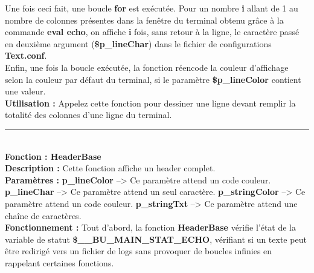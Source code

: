 \documentclass[a4paper,10pt]{article}
\begin{document}
Une fois ceci fait, une boucle \textbf{for} est exécutée. Pour un nombre \textbf{i} allant de 1 au nombre de colonnes présentes dans la fenêtre du terminal obtenu grâce à la commande \textbf{\color{gray}eval echo\color{white}}, on affiche \textbf{i} fois, sans retour à la ligne, le caractère passé en deuxième argument (\textbf{\color{orange}\$p\_lineChar\color{white}}) dans le fichier de\linebreak
configurations \textbf{\color{lime}Text.conf\color{white}}.\\[1\baselineskip]

Enfin, une fois la boucle exécutée, la fonction réencode la couleur d'affichage selon la couleur par\linebreak
défaut du terminal, si le paramètre \textbf{\color{orange}\$p\_lineColor\color{white}} contient une valeur.\\[1\baselineskip]

\textbf{Utilisation :}\linebreak
Appelez cette fonction pour dessiner une ligne devant remplir la totalité des colonnes d'une ligne du terminal.\\[2\baselineskip]


\par\noindent\rule{\textwidth}{0.4pt}\\[1\baselineskip]

\textbf{Fonction : \color{mauve}HeaderBase\color{white}}\\[1\baselineskip]
\textbf{Description :}\linebreak
Cette fonction affiche un header complet.\\[1\baselineskip]

\textbf{Paramètres :}\linebreak
\textbf{\color{orange}p\_lineColor\color{white}} --> Ce paramètre attend un code couleur.\linebreak
\textbf{\color{orange}p\_lineChar\color{white}} --> Ce paramètre attend un seul caractère.\linebreak
\textbf{\color{orange}p\_stringColor\color{white}} --> Ce paramètre attend un code couleur.\linebreak
\textbf{\color{orange}p\_stringTxt\color{white}} --> Ce paramètre attend une chaîne de caractères.\\[1\baselineskip]

\textbf{Fonctionnement :}\linebreak
Tout d'abord, la fonction \textbf{\color{mauve}HeaderBase\color{white}} vérifie l'état de la variable de statut \textbf{\color{orange}\$\_\_BU\_MAIN\_STAT\_ECHO\color{white}}, vérifiant si un texte peut être redirigé vers un fichier de logs sans provoquer de boucles infinies en\linebreak
rappelant certaines fonctions.\\[1\baselineskip]
\end{document}
